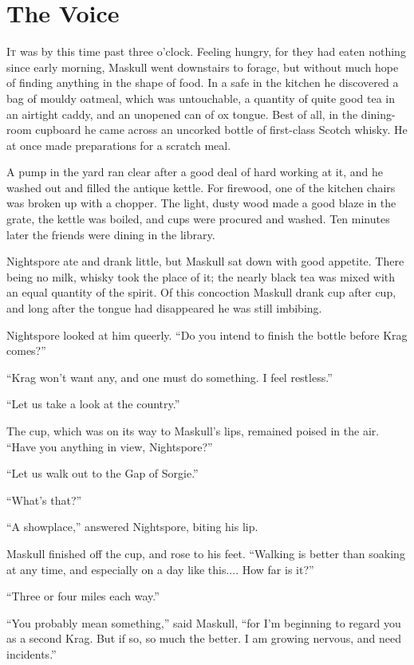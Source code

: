 \chapter{The Voice}

\lettrine{I}{t} was by this time past three o'clock. Feeling hungry, for they had eaten nothing since early morning, Maskull went downstairs to forage, but without much hope of finding anything in the shape of food. In a safe in the kitchen he discovered a bag of mouldy oatmeal, which was untouchable, a quantity of quite good tea in an airtight caddy, and an unopened can of ox tongue. Best of all, in the dining-room cupboard he came across an uncorked bottle of first-class Scotch whisky. He at once made preparations for a scratch meal.

A pump in the yard ran clear after a good deal of hard working at it, and he washed out and filled the antique kettle. For firewood, one of the kitchen chairs was broken up with a chopper. The light, dusty wood made a good blaze in the grate, the kettle was boiled, and cups were procured and washed. Ten minutes later the friends were dining in the library.

Nightspore ate and drank little, but Maskull sat down with good appetite. There being no milk, whisky took the place of it; the nearly black tea was mixed with an equal quantity of the spirit. Of this concoction Maskull drank cup after cup, and long after the tongue had disappeared he was still imbibing.

Nightspore looked at him queerly. ``Do you intend to finish the bottle before Krag comes?''

``Krag won't want any, and one must do something. I feel restless.''

``Let us take a look at the country.''

The cup, which was on its way to Maskull's lips, remained poised in the air. ``Have you anything in view, Nightspore?''

``Let us walk out to the Gap of Sorgie.''

``What's that?''

``A showplace,'' answered Nightspore, biting his lip.

Maskull finished off the cup, and rose to his feet. ``Walking is better than soaking at any time, and especially on a day like this.... How far is it?''

``Three or four miles each way.''

``You probably mean something,'' said Maskull, ``for I'm beginning to regard you as a second Krag. But if so, so much the better. I am growing nervous, and need incidents.''

